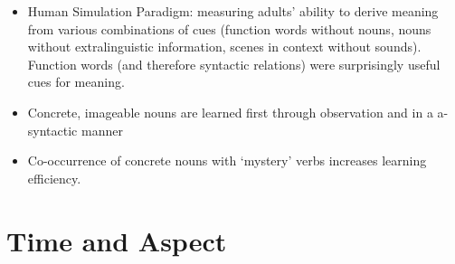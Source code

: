 \documentclass{article}
\begin{document}
\begin{itemize}
    \item Human Simulation Paradigm: measuring adults' ability to derive meaning from various combinations of cues (function words without nouns, nouns without extralinguistic information, scenes in context without sounds). Function words (and therefore syntactic relations) were surprisingly useful cues for meaning.
    \item Concrete, imageable nouns are learned first through observation and in a a-syntactic manner
    \item Co-occurrence of concrete nouns with ‘mystery’ verbs increases learning efficiency.
\end{itemize}
\section{Time and Aspect}
\end{document}
